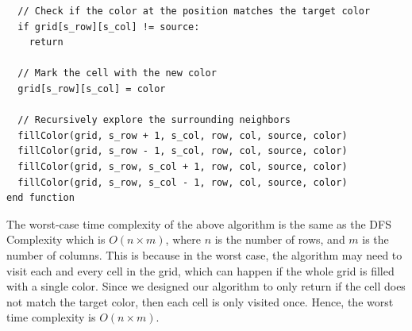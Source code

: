 \documentclass[addpoints]{exam}
\begin{document}
\begin{questions}
\begin{solution}
\begin{verbatim}
  // Check if the color at the position matches the target color
  if grid[s_row][s_col] != source:
    return

  // Mark the cell with the new color
  grid[s_row][s_col] = color

  // Recursively explore the surrounding neighbors
  fillColor(grid, s_row + 1, s_col, row, col, source, color)
  fillColor(grid, s_row - 1, s_col, row, col, source, color)
  fillColor(grid, s_row, s_col + 1, row, col, source, color)
  fillColor(grid, s_row, s_col - 1, row, col, source, color)
end function
\end{verbatim}
    The worst-case time complexity of the above algorithm is the same as the DFS Complexity which is $ O(n \times m) $, where $ n $ is the number of rows, and $ m $ is the number of columns. This is because in the worst case, the algorithm may need to visit each and every cell in the grid, which can happen if the whole grid is filled with a single color. Since we designed our algorithm to only return if the cell does not match the target color, then each cell is only visited once. Hence, the worst time complexity is $ O(n \times m) $.
  \end{solution}

\end{questions}
\end{document}
